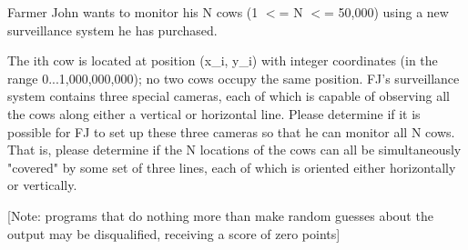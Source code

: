 Farmer John wants to monitor his N cows (1 $<$= N $<$= 50,000) using a new surveillance system he has purchased. 

The ith cow is located at position (x\_i, y\_i) with integer coordinates (in the range 0...1,000,000,000); no two cows occupy the same position.  FJ's surveillance system contains three special cameras, each of which is capable of observing all the cows along either a vertical or horizontal line.  Please determine if it is possible for FJ to set up these three cameras so that he can monitor all N cows.  That is, please determine if the N locations of the cows can all be simultaneously "covered" by some set of three lines, each of which is oriented either horizontally or vertically.

[Note: programs that do nothing more than make random guesses about the output may be disqualified, receiving a score of zero points]